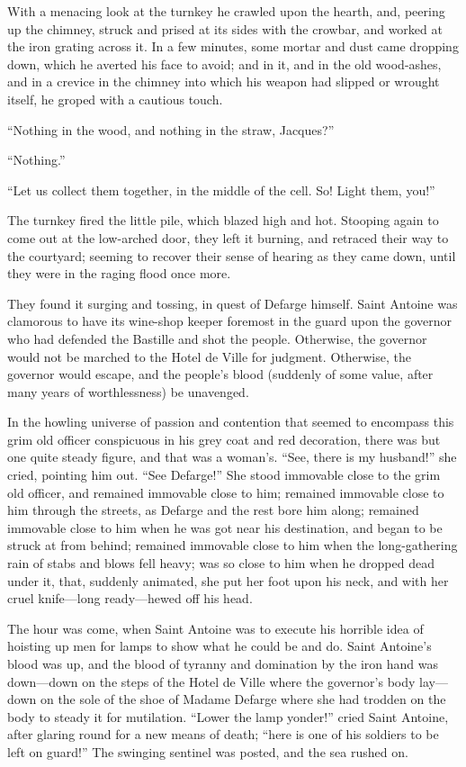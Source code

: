 With a menacing look at the turnkey he crawled upon the hearth,
and, peering up the chimney, struck and prised at its sides with the
crowbar, and worked at the iron grating across it.  In a few minutes,
some mortar and dust came dropping down, which he averted his face to
avoid; and in it, and in the old wood-ashes, and in a crevice in the
chimney into which his weapon had slipped or wrought itself, he groped
with a cautious touch.

``Nothing in the wood, and nothing in the straw, Jacques?''

``Nothing.''

``Let us collect them together, in the middle of the cell.  So!
Light them, you!''

The turnkey fired the little pile, which blazed high and hot.  Stooping
again to come out at the low-arched door, they left it burning, and
retraced their way to the courtyard; seeming to recover their sense of
hearing as they came down, until they were in the raging flood once more.

They found it surging and tossing, in quest of Defarge himself.
Saint Antoine was clamorous to have its wine-shop keeper foremost in
the guard upon the governor who had defended the Bastille and shot the
people.  Otherwise, the governor would not be marched to the Hotel de
Ville for judgment.  Otherwise, the governor would escape, and the
people's blood (suddenly of some value, after many years of
worthlessness) be unavenged.

In the howling universe of passion and contention that seemed to
encompass this grim old officer conspicuous in his grey coat and red
decoration, there was but one quite steady figure, and that was a
woman's.  ``See, there is my husband!'' she cried, pointing him out.
``See Defarge!''  She stood immovable close to the grim old officer,
and remained immovable close to him; remained immovable close to him
through the streets, as Defarge and the rest bore him along; remained
immovable close to him when he was got near his destination, and began
to be struck at from behind; remained immovable close to him when the
long-gathering rain of stabs and blows fell heavy; was so close to him
when he dropped dead under it, that, suddenly animated, she put her foot
upon his neck, and with her cruel knife---long ready---hewed off his head.

The hour was come, when Saint Antoine was to execute his horrible idea
of hoisting up men for lamps to show what he could be and do.  Saint
Antoine's blood was up, and the blood of tyranny and domination by
the iron hand was down---down on the steps of the Hotel de Ville where
the governor's body lay---down on the sole of the shoe of Madame Defarge
where she had trodden on the body to steady it for mutilation.
``Lower the lamp yonder!'' cried Saint Antoine, after glaring round for a
new means of death; ``here is one of his soldiers to be left on guard!''
The swinging sentinel was posted, and the sea rushed on.

